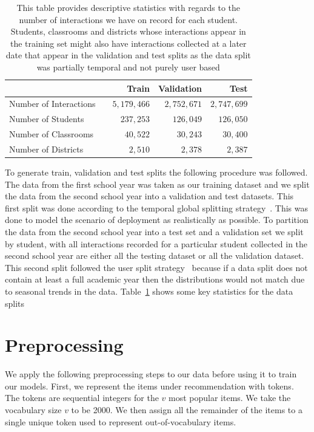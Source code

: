 \documentclass{article}
\begin{document}
\begin{table}
    \centering
    \begin{tabular}{p{3.5cm} r r r r}
         \toprule
          && \multicolumn{1}{r}{\bf Train} & \multicolumn{1}{c}{\bf Validation} & \multicolumn{1}{r}{\bf Test}  \\
         \midrule
         Number of Interactions && $5{,}179{,}466$ & $2{,}752{,}671$  & $2{,}747{,}699$ \\
         Number of Students && $237{,}253$& $126{,}049$ & $126{,}050$ \\  
         Number of Classrooms && $40{,}522$ & $30{,}243$ & $30{,}400$ \\
         Number of Districts && $2{,}510$& $2{,}378$&  $2{,}387$\\

        \bottomrule
    \end{tabular}
    \newline
    \newline
    \caption{This table provides descriptive statistics with regards to the number of interactions we have on record for each student. Students, classrooms and districts whose interactions appear in the training set might also have interactions collected at a later date that appear in the validation and test splits as the data split was partially temporal and not purely user based}
    \label{table:data_split}
\end{table}

To generate train, validation and test splits the following procedure was followed. The data from the first school year was taken as our training dataset and we split the data from the second school year into a validation and test datasets.  This first split was done according to the temporal global splitting strategy~\cite{meng2020split}. This was done to model the scenario of deployment as realistically as possible. To partition the data from the second school year into a test set and a validation set we split by student, with all interactions recorded for a particular student collected in the second school year are either all the testing dataset or all the validation dataset. This second split followed the user split strategy~\cite{meng2020split} because if a data split does not contain at least a full academic year then the distributions would not match due to seasonal trends in the data. Table~\ref{table:data_split} shows some key statistics for the data splits

\section{Preprocessing}
 We apply the following preprocessing steps to our data before using it to train our models. 
First, we represent the items under recommendation with tokens. The tokens are sequential integers for the $v$ most popular items. We take the vocabulary size $v$ to be 2000. We then assign all the remainder of the items to a single unique token used to represent out-of-vocabulary items. 
\end{document}
